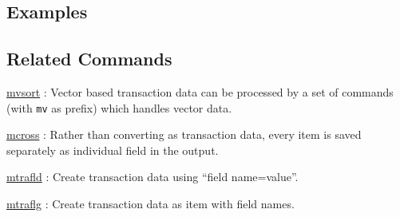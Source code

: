 \subsection*{Examples}

\subsection*{Related Commands}
\hyperref[sect:mvsort]{mvsort} : Vector based transaction data can be processed by a set of commands  (with \verb|mv| as prefix) which handles vector data. 

\hyperref[sect:mcross]{mcross} : Rather than converting as transaction data, every item is saved separately as individual field in the output. 

\hyperref[sect:mtrafld]{mtrafld} :  Create transaction data using “field name=value”.

\hyperref[sect:mtraflg]{mtraflg} : Create transaction data as item with field names.

%
